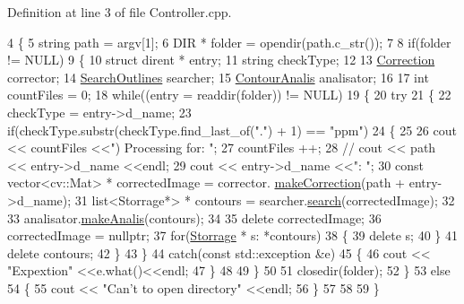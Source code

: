 Definition at line 3 of file Controller.\+cpp.


\begin{DoxyCode}
4 \{
5     \textcolor{keywordtype}{string} path = argv[1];
6     DIR * folder = opendir(path.c\_str());
7 
8     \textcolor{keywordflow}{if}(folder != NULL)
9     \{
10         \textcolor{keyword}{struct }dirent * entry;
11         \textcolor{keywordtype}{string} checkType;
12 
13         \hyperlink{class_correction}{Correction} corrector;
14         \hyperlink{class_search_outlines}{SearchOutlines} searcher;
15         \hyperlink{class_contour_analis}{ContourAnalis} analisator;
16 
17         \textcolor{keywordtype}{int} countFiles = 0;
18         \textcolor{keywordflow}{while}((entry = readdir(folder)) != NULL)
19         \{
20             \textcolor{keywordflow}{try}
21             \{
22                 checkType = entry->d\_name;
23                 \textcolor{keywordflow}{if}(checkType.substr(checkType.find\_last\_of(\textcolor{stringliteral}{"."}) + 1) == \textcolor{stringliteral}{"ppm"})
24                 \{
25 
26                     cout << countFiles <<\textcolor{stringliteral}{") Processing for: "};
27                     countFiles ++;
28 \textcolor{comment}{//                    cout << path << entry->d\_name <<endl;}
29                     cout << entry->d\_name <<\textcolor{stringliteral}{": "};
30                     \textcolor{keyword}{const} vector<cv::Mat> * correctedImage = corrector.
      \hyperlink{class_correction_a2a43e98d77beaf6fee39a6fe1bbfbb26}{makeCorrection}(path + entry->d\_name);
31                     list<Storrage*> * contours = searcher.\hyperlink{class_search_outlines_af38a752797a850533995230928187e32}{search}(correctedImage);
32 
33                     analisator.\hyperlink{class_contour_analis_a8c398a82aced99e9e44b378743652a90}{makeAnalis}(contours);
34 
35                     \textcolor{keyword}{delete} correctedImage;
36                     correctedImage = \textcolor{keyword}{nullptr};
37                     \textcolor{keywordflow}{for}(\hyperlink{class_storrage}{Storrage} * s: *contours)
38                     \{
39                         \textcolor{keyword}{delete} s;
40                     \}
41                     \textcolor{keyword}{delete} contours;
42                 \}
43              \}
44              \textcolor{keywordflow}{catch}(\textcolor{keyword}{const} std::exception &e)
45              \{
46                 cout << \textcolor{stringliteral}{"Expextion"} <<e.what()<<endl;
47              \}
48 
49         \}
50 
51         closedir(folder);
52     \}
53     \textcolor{keywordflow}{else}
54     \{
55         cout << \textcolor{stringliteral}{"Can't to open directory"} <<endl;
56     \}
57 
58 
59 \}
\end{DoxyCode}
